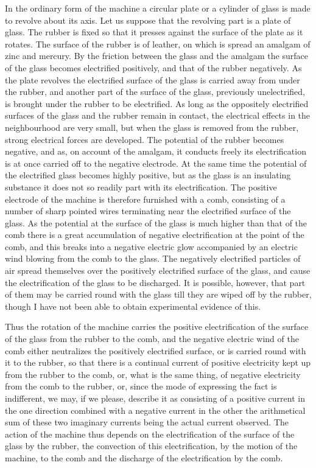 \documentclass[12pt,oneside]{book}[2021/10/04]
\newcommand{\¬}{\hphantom{0}}
\begin{document}
In the ordinary form of the machine a circular plate or a cylinder
of glass is made to revolve about its axis. Let us suppose that the
revolving part is a plate of glass. The rubber is fixed so that it
presses against the surface of the plate as it rotates. The surface
of the rubber is of leather, on which is spread an amalgam of zinc
and mercury. By the friction between the glass and the amalgam
the surface of the glass becomes electrified positively, and that of
the rubber negatively. As the plate revolves the electrified surface
of the glass is carried away from under the rubber, and another
part of the surface of the glass, previously unelectrified, is brought
under the rubber to be electrified. As long as the oppositely
electrified surfaces of the glass and the rubber remain in contact,
the electrical effects in the neighbourhood are very small, but when
the glass is removed from the rubber, strong electrical forces are
developed. The potential of the rubber becomes negative, and as,
on account of the amalgam, it conducts freely its electrification is
at once carried off to the negative electrode. At the same time the
potential of the electrified glass becomes highly positive, but as the
glass is an insulating substance it does not so readily part with its
electrification. The positive electrode of the machine is therefore
furnished with a comb, consisting of a number of sharp pointed
wires terminating near the electrified surface of the glass. As the
potential at the surface of the glass is much higher than that of
the comb there is a great accumulation of negative electrification
at the point of the comb, and this breaks into a negative electric
glow accompanied by an electric wind blowing from the comb to
the glass. The negatively electrified particles of air spread themselves
over the positively electrified surface of the glass, and cause
the electrification of the glass to be discharged. It is possible,
however, that part of them may be carried round with the glass till
they are wiped off by the rubber, though I have not been able to
obtain experimental evidence of this.

Thus the rotation of the machine carries the positive electrification
of the surface of the glass from the rubber to the comb,
and the negative electric wind of the comb either neutralizes the
positively electrified surface, or is carried round with it to the
rubber, so that there is a continual current of positive electricity
kept up from the rubber to the comb, or, what is the same thing,
of negative electricity from the comb to the rubber, or, since the
mode of expressing the fact is indifferent, we may, if we please,
describe it as consisting of a positive current in the one direction
combined with a negative current in the other the arithmetical
sum of these two imaginary currents being the actual current
observed. The action of the machine thus depends on the electrification
of the surface of the glass by the rubber, the convection of
this electrification, by the motion of the machine, to the comb and
the discharge of the electrification by the comb.
\end{document}

